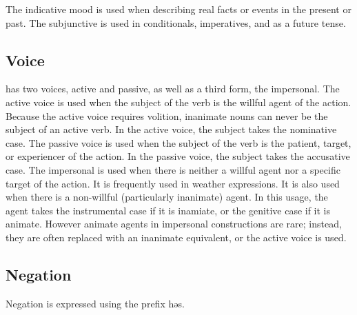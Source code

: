 The indicative mood is used when describing real facts or events in the present
or past.
The subjunctive is used in conditionals, imperatives, and as a future tense.

\subsection{Voice}
\Langname{} has two voices, active and passive, as well as a third form, the
impersonal.
The active voice is used when the subject of the verb is the willful agent of
the action.
Because the active voice requires volition, inanimate nouns can never be the
subject of an active verb.
In the active voice, the subject takes the nominative case.
The passive voice is used when the subject of the verb is the patient, target,
or experiencer of the action.
In the passive voice, the subject takes the accusative case.
The impersonal is used when there is neither a willful agent nor a specific
target of the action.
It is frequently used in weather expressions.
It is also used when there is a non-willful (particularly inanimate) agent.
In this usage, the agent takes the instrumental case if it is inamiate, or the
genitive case if it is animate.
However animate agents in impersonal constructions are rare; instead, they are
often replaced with an inanimate equivalent, or the active voice is used.

\subsection{Negation}
Negation is expressed using the prefix {\ll həs}.

